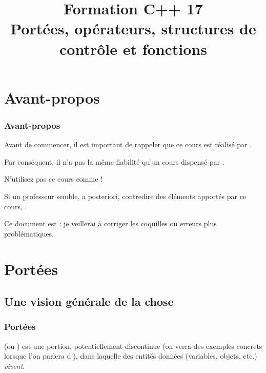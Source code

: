 \documentclass{cppcourses}
\title[Formation C++ 17]{
    Formation C++ 17 \no 02 \\
    \small{Portées, opérateurs, structures de contrôle et fonctions}
}
\begin{document}
\frame{\titlepage}
\frame{\tableofcontents[pausesections, subsubsectionstyle = hide]}

\section{Avant-propos}

\begin{frame}

\frametitle{Avant-propos}

Avant de commencer, il est important de rappeler que ce cours est réalisé par .

Par conséquent, il n'a pas la même fiabilité qu'un cours dispensé par .

N'utilisez pas ce cours comme  !

Si un professeur semble, a posteriori, contredire des éléments apportés par ce cours, .

Ce document est  : je veillerai à corriger les coquilles ou erreurs plus problématiques.

\end{frame}

\section{Portées}

\subsection{Une vision générale de la chose}

\begin{frame}

\frametitle{Portées}

\begin{definition}
 (ou ) est une portion, potentiellement discontinue (on verra des exemples concrets lorsque l'on parlera d'), dans laquelle des entités données (variables, objets, etc.) \emph{vivent}.
\end{definition}


\end{frame}
\end{document}
